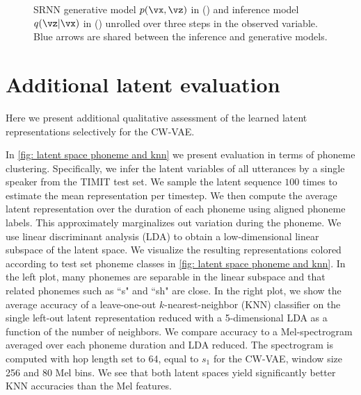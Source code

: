 {\begin{figure}[t!]
\begin{subfigure}[b]{0.48\textwidth}
    \caption{}
    \label{fig: srnn graphical model inference}
    \end{subfigure}
\caption{
    SRNN \parencite{fraccaro_sequential_2016} generative model $p(\vx,\vz)$ in () and inference model $q(\vz|\vx)$ in () unrolled over three steps in the observed variable. 
    Blue arrows are shared between the inference and generative models.
}
\label{fig: srnn graphical models (inference and generative)}
\end{figure}




\section{Additional latent evaluation}\label{app: additional latent space clustering}
Here we present additional qualitative assessment of the learned latent representations selectively for the CW-VAE. 

In \cref{fig: latent space phoneme and knn} we present evaluation in terms of phoneme clustering. 
Specifically, we infer the latent variables of all utterances by a single speaker from the TIMIT test set. We sample the latent sequence $100$ times to estimate the mean representation per timestep. We then compute the average latent representation over the duration of each phoneme using aligned phoneme labels. This approximately marginalizes out variation during the phoneme. We use linear discriminant analysis (LDA) \parencite{fisher_use_1936} to obtain a low-dimensional linear subspace of the latent space. 
We visualize the resulting representations colored according to test set phoneme classes in \cref{fig: latent space phoneme and knn}. 
In the left plot, many phonemes are separable in the linear subspace and that related phonemes such as ``s" and ``sh" are close. 
In the right plot, we show the average accuracy of a leave-one-out $k$-nearest-neighbor (KNN) classifier on the single left-out latent representation reduced with a 5-dimensional LDA as a function of the number of neighbors. 
We compare accuracy to a Mel-spectrogram averaged over each phoneme duration and LDA reduced. The spectrogram is computed with hop length set to 64, equal to $s_1$ for the CW-VAE, window size 256 and 80 Mel bins.
We see that both latent spaces yield significantly better KNN accuracies than the Mel features.

}
